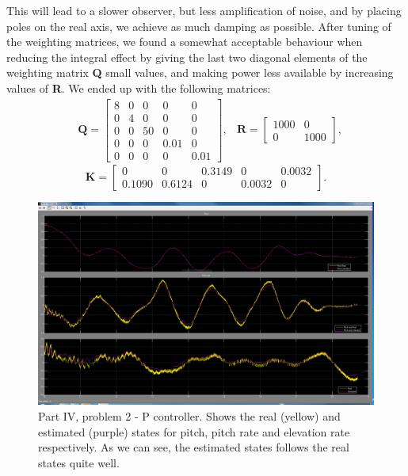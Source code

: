 This will lead to a slower observer, but less amplification of noise, and by placing poles on the real axis, we achieve as much damping as possible. After tuning of the weighting matrices, we found a somewhat acceptable behaviour when reducing the integral effect by giving the last two diagonal elements of the weighting matrix \textbf{Q} small values, and making power less available by increasing values of \textbf{R}. We ended up with the following matrices:
\begin{align}\nonumber
&\mathbf{Q} = 
\begin{bmatrix}
    8 & 0 & 0 & 0 & 0\\
    0 & 4 & 0 & 0 & 0\\
    0 & 0 & 50 & 0 & 0\\
    0 & 0 & 0 & 0.01 & 0\\
    0 & 0 & 0 & 0 & 0.01
\end{bmatrix},
&\mathbf{R} =
\begin{bmatrix}
    1000 & 0\\
    0 & 1000
\end{bmatrix},
\end{align}
\begin{equation}\nonumber
\mathbf{K} =
\begin{bmatrix}
    0 & 0 & 0.3149 & 0 & 0.0032\\
    0.1090 & 0.6124 & 0 & 0.0032 & 0
\end{bmatrix}.
\end{equation}
\begin{figure}[htb]
	\centering
		\includegraphics[width=1\textwidth]{figures/superplots_P4p2_del1_best_husk_ratenavn.PNG}
	\caption{Part IV, problem 2 - P controller. Shows the real (yellow) and estimated (purple) states for pitch, pitch rate and elevation rate respectively. As we can see, the estimated states follows the real states quite well.}
\label{fig:P4p2_states_vs_obs}
\end{figure}
